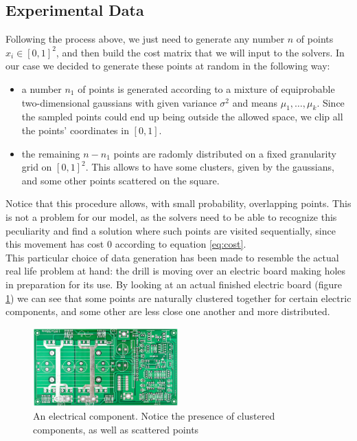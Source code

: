 \documentclass{article}
\begin{document}
\subsection{Experimental Data}\label{sec:experimental_data}
Following the process above, we just need to generate any number $n$ of points $x_i \in [0, 1]^2 $, and then build the cost matrix that we will input to the solvers. In our case we decided to generate these points at random in the following way:
\begin{itemize}
\item a number $n_1$ of points is generated according to a mixture of equiprobable two-dimensional gaussians with given variance $\sigma^2$ and means $\mu_1, \ldots, \mu_k$. Since the sampled points could end up being outside the allowed space, we clip all the points' coordinates in $[0, 1]$. 
\item the remaining $n-n_1$ points are radomly distributed on a fixed granularity grid on  $[0, 1]^2$. This allows to have some clusters, given by the gaussians, and some other points scattered on the square. 
\end{itemize}
Notice that this procedure allows, with small probability, overlapping points. This is not a problem for our model, as the solvers need to be able to recognize this peculiarity and find a solution where such points are visited sequentially, since this movement has cost 0 according to equation \eqref{eq:cost}. \\
This particular choice of data generation has been made to resemble the actual real life problem at hand: the drill is moving over an electric board making holes in preparation for its use. By looking at an actual finished electric board (figure \ref{fig:board}) we can see that some points are naturally clustered together for certain electric components, and some other are less close one another and more distributed.

\begin{figure}
\centering
\includegraphics[width=0.5\textwidth]{pics/electric_frame.png}
\caption{An electrical component. Notice the presence of clustered components, as well as scattered points}
\label{fig:board}
\end{figure}
\end{document}
